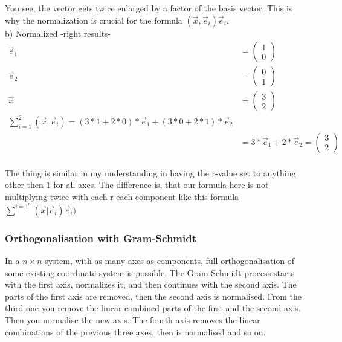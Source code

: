 \documentclass[a4paper]{article}
\begin{document}
You see, the vector gets twice enlarged by a factor of the basis vector. This is why the normalization is crucial for the formula  $(\vec{x},\vec{e}_{i})\vec{e}_{i}$.\\

b) Normalized -right results-\\

\begin{displaymath}
\begin{align}
\vec{e}_{1} &= \begin{pmatrix}1\\0\end{pmatrix}\\
\vec{e}_{2} &= \begin{pmatrix}0\\1\end{pmatrix}\\
\vec{x} &= \begin{pmatrix}3\\2\end{pmatrix}\\
\sum_{i=1}^{2}(\vec{x},\vec{e}_i) = (3*1+2*0)*\vec{e}_{1} + (3*0+2*1)*\vec{e}_{2}\\ 
&= 3*\vec{e}_{1} + 2*\vec{e}_{2} = \begin{pmatrix}3\\2\end{pmatrix}\\
\end{align}
\end{displaymath}


The thing is similar in my understanding in having the r-value set to anything other then $1$ for all axes. The difference is, that our formula here is not multiplying twice with each r each component like this formula $\sum^{i=1}^{n}(\vec{x}|\vec{e}_{i})\vec{e}_{i})$






\subsubsection{Orthogonalisation with Gram-Schmidt}

In a $n \times n$ system, with as many axes as components, full orthogonalisation of some existing coordinate system is possible. The Gram-Schmidt process starts with the first axis, normalizes it, and then continues with the second axis. The parts of the first axis are removed, then the second axis is normalised. From the third one you remove the linear combined parts of the first and the second axis. Then you normalise the new axis. The fourth axis removes the linear combinations of the previous three axes, then is normalised and so on. 
 
\end{document}
